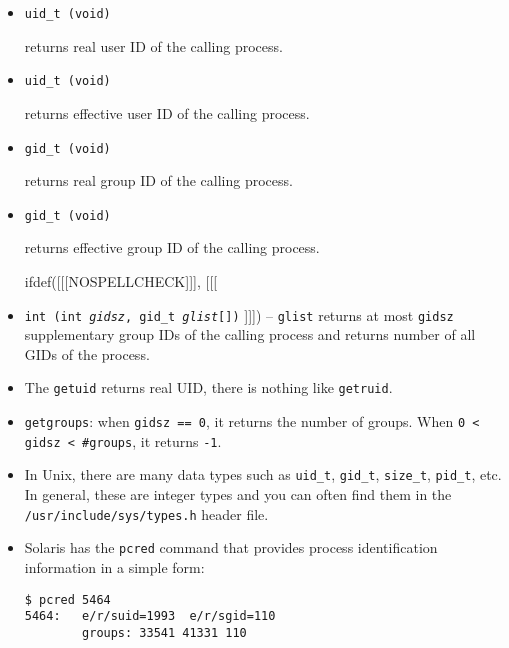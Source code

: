 \begin{slide}
\begin{itemize}
\item \texttt{uid\_t (void)}

returns real user ID of the calling process.
\item \texttt{uid\_t (void)}

returns effective user ID of the calling process.
\item \texttt{gid\_t (void)}

returns real group ID of the calling process.
\item \texttt{gid\_t (void)}

returns effective group ID of the calling process.

ifdef([[[NOSPELLCHECK]]], [[[
\item \texttt{int (int \emph{gidsz}, gid\_t \emph{glist}[])}
]]])
-- \texttt{glist} returns at most \texttt{gidsz} supplementary group
IDs of the calling process and returns number of all GIDs of the process.
\end{itemize}
\end{slide}

\begin{itemize}
\item The \texttt{getuid} returns real UID, there is nothing like
\texttt{getruid}.
\item \texttt{getgroups}: when \texttt{gidsz~==~0}, it returns the number of
groups. When \texttt{0 < gidsz < \#groups}, it returns \texttt{-1}.
\item In Unix, there are many data types such as \verb#uid_t#, \verb#gid_t#,
\verb#size_t#, \verb#pid_t#, etc.  In general, these are integer types and you
can often find them in the \texttt{/usr/inc{}lude/sys/types.h} header file.
\item Solaris has the \texttt{pcred} command that provides process
identification information in a simple form:

\begin{verbatim}
$ pcred 5464
5464:   e/r/suid=1993  e/r/sgid=110
        groups: 33541 41331 110
\end{verbatim}
\end{itemize}



